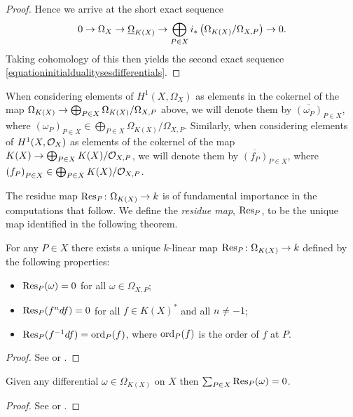 \begin{cor}
\begin{proof}
    Hence we arrive at the short exact sequence
        \begin{equation}\label{equationshortexactsequencedifferentialsdirectsum}
        0 \rightarrow \Omega_X \rightarrow \underline{\Omega}_{K(X)} \rightarrow \bigoplus_{P \in X} i_* \left( \Omega_{K(X)}/\Omega_{X,P} \right)  \rightarrow 0.
        \end{equation}
    Taking cohomology of this then yields the second exact sequence \eqref{equationinitialdualitysesdifferentials}.
    \end{proof}

    \begin{rem}
        When considering elements of $H^1(X,\Omega_X)$ as elements in the cokernel of the map $\Omega_{K(X)} \rightarrow \bigoplus_{P \in X}\Omega_{K(X)}/\Omega_{X,P}$ above, we will denote them by $\overline{(\omega_P)}_{P \in X}$, where ${(\omega_P)}_{P \in X}\in \bigoplus_{P \in X}\Omega_{K(X)}/\Omega_{X,P}$.
        Similarly, when considering elements of $H^1(X,\mathcal{O}_X)$ as elements of the cokernel of the map $K(X) \rightarrow \bigoplus_{P \in X}K(X)/{\cal O}_{X,P}$, we will denote them by $\overline{(f_P)}_{P \in X}$, where ${(f_P)}_{P \in X} \in \bigoplus_{P \in X}K(X)/{\cal O}_{X,P}$.
    \end{rem}

The residue map $\operatorname{Res}_P \colon \Omega_{K(X)} \rightarrow k$ is of fundamental importance in the computations that follow.
We define the {\em residue map}, $\operatorname{Res}_P$, to be the unique map identified in the following theorem.

    \begin{thm}\label{theoremresiduemap}
    For any $P\in X$ there exists a unique $k$-linear map $\operatorname{Res}_P \colon \Omega_{K(X)} \rightarrow k$ defined by the following properties:
        \begin{itemize}
            \item $\operatorname{Res}_P(\omega) = 0$ for all $\omega \in \Omega_{X,P}$;
            \item $\operatorname{Res}_P(f^ndf) = 0$ for all $f \in K(X)^*$ and all $n \neq -1$;
            \item $\operatorname{Res}_P(f^{-1}df) = \operatorname{ord}_P(f)$, where $\operatorname{ord}_P(f)$ is the order of $f$ at $P$.
        \end{itemize}
    \end{thm}
    \begin{proof}
    See \cite[Chap.\ II, \S 7 and \S 11]{algebraicgroupsandclassfields} or \cite{residuesofdifferentialsoncurve}.
    \end{proof}


    \begin{thm}\label{theoremresiduetheorem}
    Given any differential $\omega \in \Omega_{K(X)}$ on $X$ then $\sum_{P \in X}\operatorname{Res}_P(\omega) = 0$.
    \end{thm}
    \begin{proof}
    See \cite[Chap.\ II, Prop.\ 6]{algebraicgroupsandclassfields} or \cite[Pg.\ 155]{residuesofdifferentialsoncurve}.
    \end{proof}


\end{cor}
